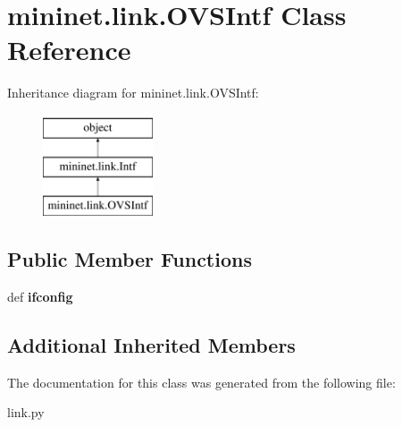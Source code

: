 \hypertarget{classmininet_1_1link_1_1OVSIntf}{\section{mininet.\-link.\-O\-V\-S\-Intf Class Reference}
\label{classmininet_1_1link_1_1OVSIntf}
}
Inheritance diagram for mininet.\-link.\-O\-V\-S\-Intf\-:\begin{figure}[H]
\begin{center}
\leavevmode
\includegraphics[height=3.000000cm]{classmininet_1_1link_1_1OVSIntf}
\end{center}
\end{figure}
\subsection*{Public Member Functions}
\begin{DoxyCompactItemize}
\item 
\hypertarget{classmininet_1_1link_1_1OVSIntf_aa133f507fede31a167fac6ac1e059563}{def {\bfseries ifconfig}}\label{classmininet_1_1link_1_1OVSIntf_aa133f507fede31a167fac6ac1e059563}

\end{DoxyCompactItemize}
\subsection*{Additional Inherited Members}


The documentation for this class was generated from the following file\-:\begin{DoxyCompactItemize}
\item 
link.\-py\end{DoxyCompactItemize}

